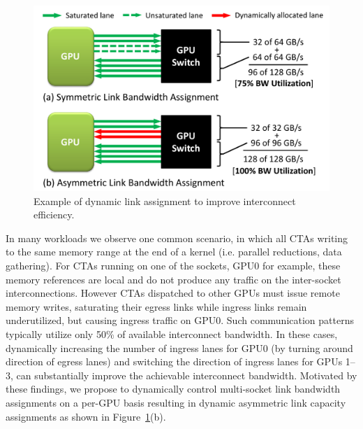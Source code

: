 \begin{figure}[t]
    \centering
    \includegraphics[width=1.0\columnwidth]{figures/link_assignment.pdf}
    \caption{Example of dynamic link assignment to improve interconnect efficiency.}
    \label{fig:symmetric_assymetric}
    \vspace{-.25in}
\end{figure}

In many workloads we observe one common
scenario, in which all CTAs writing to the same memory range at the end of a
kernel (i.e. parallel reductions, data gathering). For CTAs running on one of the
sockets, GPU0 for example, these memory references are local and do not
produce any traffic on the inter-socket interconnections. However CTAs dispatched
to other GPUs must issue remote memory writes, saturating their egress links while
ingress links remain underutilized, but causing ingress traffic on GPU0. 
Such communication patterns typically utilize only
50\% of available interconnect bandwidth. In these cases, dynamically increasing the 
number of ingress lanes for GPU0
(by turning around direction of egress lanes) and switching the direction of
ingress lanes for GPUs 1--3, can substantially improve the achievable interconnect
bandwidth. Motivated by these findings, we propose to dynamically control multi-socket
link bandwidth assignments on a per-GPU basis resulting in
dynamic asymmetric link capacity assignments as shown in
Figure~\ref{fig:symmetric_assymetric}(b).  

